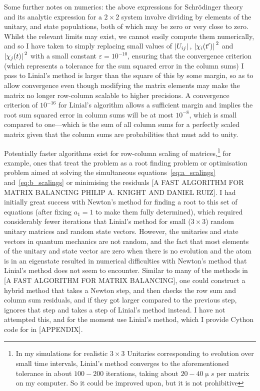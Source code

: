 Some further notes on numerics: the above expressions for Schr\"odinger theory and its analytic expression for a $2\times2$ system involve dividing by elements of the unitary, and state populations, both of which may be zero or very close to zero. Whilst the relevant limits may exist, we cannot easily compute them numerically, and so I have taken to simply replacing small values of $\abs{U_{ij}}$, $\abs{\chi_i(t^\prime)}^2$ and $\abs{\chi_j(t)}^2$ with a small constant $\varepsilon=10^{-10}$, ensuring that the convergence criterion (which represents a tolerance for the sum squared error in the column sums) I pass to Linial's method is larger than the square of this by some margin, so as to allow convergence even though modifying the matrix elements may make the matrix no longer row-column scalable to higher precisions. A convergence criterion of $10^{-16}$ for Linial's algorithm allows a sufficient margin and implies the root sum squared error in column sums will be at most $10^{-8}$, which is small compared to one---which is the sum of all column sums for a perfectly scaled matrix given that the column sums are probabilities that must add to unity.

Potentially faster algorithms exist for row-column scaling of matrices,\footnote{In my simulations for realistic $3\times3$ Unitaries corresponding to evolution over small time intervals, Linial's method converges to the aforementioned tolerance in about $100-200$ iterations, taking about $20-40\unit{\upmu s}$ per matrix on my computer. So it could be improved upon, but it is not prohibitive} for example, ones that treat the problem as a root finding problem or optimisation problem aimed at solving the simultaneous equations~\eqref{eq:a_scalings} and~\eqref{eq:b_scalings} or minimising the residuals [A FAST ALGORITHM FOR MATRIX BALANCING PHILIP A. KNIGHT AND DANIEL RUIZ]. I had initially great success with Newton's method for finding a root to this set of equations (after fixing $a_1=1$ to make them fully determined), which required considerably fewer iterations that Linial's method for small ($3\times3$) random unitary matrices and random state vectors. However, the unitaries and state vectors in quantum mechanics are not random, and the fact that most elements of the unitary and state vector are zero when there is no evolution and the atom is in an eigenstate resulted in numerical difficulties with Newton's method that Linial's method does not seem to encounter. Similar to many of the methods in [A FAST ALGORITHM FOR MATRIX BALANCING], one could construct a hybrid method that takes a Newton step, and then checks the row sum and column sum residuals, and if they got larger compared to the previous step, ignores that step and takes a step of Linial's method instead. I have not attempted this, and for the moment use Linial's method, which I provide Cython code for in [APPENDIX].

